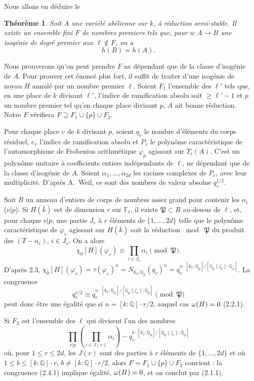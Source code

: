\documentclass[12pt,a4paper]{article}
\theoremstyle{plain}
\newtheorem{theorem}{Théorème}[section]
\theoremstyle{definition}
\theoremstyle{remark}
\newcommand{\QQ}{\mathbb{Q}}
\newcommand{\FF}{\mathbb{F}}
\let\deg\relax
\providecommand{\FF}{\mathbb{F}}
\providecommand{\QQ}{\mathbb{Q}}
\providecommand{\fP}{\mathfrak{P}}
\begin{document}
Nous allons en déduire le

\begin{theorem}
Soit $A$ une variété abélienne sur $k$, à réduction semi-stable. Il existe un ensemble fini $F$ de nombres premiers tels que, pour $u : A \to B$ une isogénie de degré premier aux $\ell \notin F$, on a
\[
h(B) = h(A). \tag{2.4.1}
\]
\end{theorem}

Nous prouverons qu'on peut prendre $F$ ne dépendant que de la classe d'isogénie de $A$. Pour prouver cet énoncé plus fort, il suffit de traiter d'une isogénie de noyau $H$ annulé par un nombre premier $\ell$. Soient $F_1$ l'ensemble des $\ell'$ tels que, en une place de $k$ divisant $\ell'$, l'indice de ramification absolu soit $\geq \ell' - 1$ et $p$ un nombre premier tel qu'en chaque place divisant $p$, $A$ ait bonne réduction. Notre $F$ vérifiera $F \supseteq F_1 \cup \{p\} \cup F_2$.

Pour chaque place $v$ de $k$ divisant $p$, soient $q_v$ le nombre d'éléments du corps résiduel, $e_v$ l'indice de ramification absolu et $P_v$ le polynôme caractéristique de l'automorphisme de Frobenius arithmétique $\varphi_p$ agissant sur $T_\ell(A)$. C'est un polynôme unitaire à coefficients entiers indépendants de $\ell$, ne dépendant que de la classe d'isogénie de $A$. Soient $\alpha_1, \ldots, \alpha_{2d}$ les racines complexes de $P_v$, avec leur multiplicité. D'après A.~Weil, ce sont des nombres de valeur absolue $q_v^{1/2}$.

Soit $R$ un anneau d'entiers de corps de nombres assez grand pour contenir les $\alpha_i$ ($v|p$). Si $H(\overline{k})$ est de dimension $r$ sur $\FF_\ell$, il existe $\fP \subset R$ au-dessus de $\ell$, et, pour chaque $v|p$, une partie $J_v$ à $r$ éléments de $\{1, \ldots, 2d\}$ telle que le polynôme caractéristique de $\varphi_v$ agissant sur $H(\overline{k})$ soit la réduction $\bmod\ \fP$ du produit des $(T - \alpha_i)$, $i \in J_v$. On a alors
\[
\chi_0[H](\varphi_v) \equiv \prod_{i \in J_v} \alpha_i \pmod{\fP}.
\]
D'après 2.3, $\chi_0[H](\varphi_v) = \tau(\varphi_v)^n = N_{k_v/\QQ_p}(q_v)^n = q_v^{n \cdot [k_v:\QQ_p]/[\QQ_p(\zeta_\ell):\QQ_p]}$. La congruence
\[
q_v^{r/2} \equiv q_v^{n \cdot [k_v:\QQ_p]/[\QQ_p(\zeta_\ell):\QQ_p]} \pmod{\fP}
\]
peut donc être une égalité que si $n = [k:\QQ] \cdot r/2$, auquel cas $\deg \omega(H) = 0$ (2.2.1).

Si $F_2$ est l'ensemble des $\ell$ qui divisent l'un des nombres
\[
\prod_{v|p} \left(\prod_{i \in J(v)} \alpha_i \right) - q_v^{b \cdot [k_v:\QQ_p]/[\QQ_p(\zeta_\ell):\QQ_p]}
\]
où, pour $1 \leq r \leq 2d$, les $J(v)$ sont des parties à $r$ éléments de $\{1, \ldots, 2d\}$ et où $1 \leq b \leq [k:\QQ] \cdot r$, $b \neq [k:\QQ] \cdot r/2$, alors $F = F_1 \cup \{p\} \cup F_2$ convient : la congruence (2.4.1) implique égalité, $\deg \omega(H) = 0$, et on conclut par (2.1.1).
\end{document}
